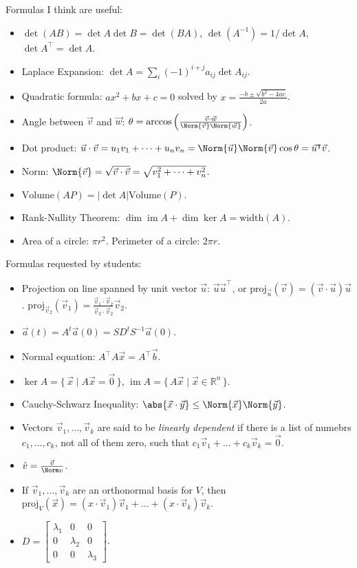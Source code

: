 \documentclass[addpoints]{exam}
\DeclarePairedDelimiter{\Norm}\lVert\rVert
\DeclarePairedDelimiter{\abs}\lvert\rvert
\newcommand{\R}{\mathbb{R}}
\newcommand{\tr}{\intercal}
\newcommand{\im}{\mathop{\mathrm{im}}}
\begin{document}
\noindent Formulas I think are useful:
\begin{itemize}
\item $\det(AB) = \det A \det B = \det(BA)$, $\det(A^{-1}) = 1/\det A$, $\det A^\tr = \det A$.
\item Laplace Expansion: $\det A = \sum_i (-1)^{i+j} a_{ij} \det A_{ij}$.
\item Quadratic formula: $ax^2 + bx + c = 0$ solved by $x = \frac{-b\pm\sqrt{b^2 -4ac}}{2a}$.
\item Angle between $\vec v$ and $\vec w$: $\theta = \arccos\left(\frac{\vec v \cdot \vec w}{\Norm{\vec v} \Norm{\vec w}}\right)$.
\item Dot product: $\vec u \cdot \vec v = u_1 v_1 + \dots + u_n v_n = \Norm{\vec u} \Norm{\vec v} \cos\theta = \vec{u}^\tr \vec v$.
\item Norm: $\Norm{\vec v}=\sqrt{\vec v \cdot \vec v} = \sqrt{v_1^2 + \dots + v_n^2}$.
\item $\mathrm{Volume}(AP) = \lvert \det A \rvert \mathrm{Volume}(P)$.
\item Rank-Nullity Theorem: $\dim \im A + \dim \ker A = \mathrm{width}(A)$.
\item Area of a circle: $\pi r^2$. Perimeter of a circle: $2 \pi r$.
\end{itemize}
\noindent Formulas requested by students:
{\small
\begin{itemize}
\item Projection on line spanned by unit vector $\vec u$: $\vec u \vec u^\tr$, or $\mathrm{proj}_{\vec u}(\vec v) = (\vec v \cdot \vec u) \vec u$. $\mathrm{proj}_{\vec v_2}(\vec v_1) = \frac{\vec v_1 \cdot \vec v_2}{\vec v_2 \cdot \vec v_2} \vec v_2$.

\item $\vec a(t)=A^t \vec a(0)=SD^t S^{-1} \vec a(0)$.
\item Normal equation: $A^\tr A \vec x = A^\tr \vec b$.
\item $\ker A = \{\,\vec x \mid A\vec x = \vec 0\,\}$, $\im A = \{\,A\vec x \mid \vec x \in \R^n\,\}$.
\item Cauchy-Schwarz Inequality: $\abs{\vec x \cdot \vec y} \leq \Norm{\vec x} \Norm{\vec y}$.
\item Vectors $\vec v_1 ,\dots , \vec v_k$ are said to be \emph{linearly dependent} if there is a list of numebrs $c_1, \dots, c_k$, not all of them zero, such that $c_1 \vec v_1 + \dots + c_k \vec v_k = \vec 0$.
\item $\hat v = \frac{\vec v}{\Norm v}$.
\item If $\vec v_1, \dots, \vec v_k$ are an orthonormal basis for $V$, then $\mathrm{proj}_V(\vec x) = (x\cdot \vec v_1) \vec v_1 + \dots + (x \cdot \vec v_k) \vec v_k$.
\item $D = \left[\begin{smallmatrix} \lambda_1 & 0 & 0 \\
0 & \lambda_2 & 0 \\
0 & 0 & \lambda_3\end{smallmatrix}\right]$.
\end{itemize}
}
\end{document}
